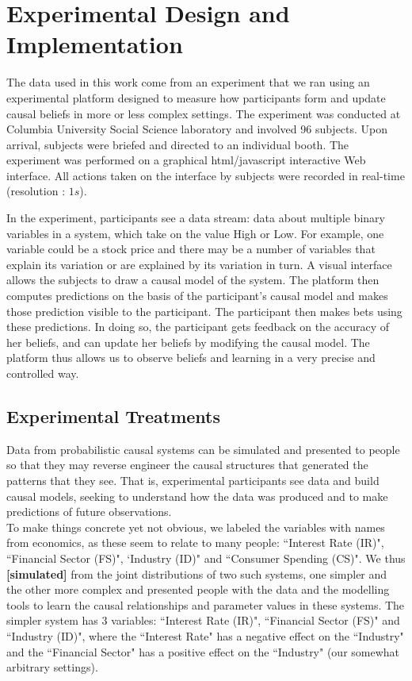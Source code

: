 \section{Experimental Design and Implementation}
\label{SI_experiment}

The data used in this work come from an experiment that we ran using an experimental platform designed to measure how participants form and update causal beliefs in more or less complex settings.  The experiment was conducted at Columbia University Social Science laboratory and involved 96 subjects.  Upon arrival, subjects were briefed and directed to an individual booth. The experiment was performed on a graphical  html/javascript interactive Web interface. All actions taken on the interface by subjects were recorded in real-time (resolution : $1s$). 

In the experiment, participants see a data stream: data about multiple binary variables in a system, which take on the value High or Low. For example, one variable could be a stock price and there may be a number of variables that explain its variation or are explained by its variation in turn.  A visual interface allows the subjects to draw a causal model of the system. The platform then computes predictions on the basis of the participant's causal model and makes those prediction visible to the participant. The participant then makes bets using these predictions. In doing so, the participant gets feedback on the accuracy of her beliefs, and can update her beliefs by modifying the causal model. The platform thus allows us to observe beliefs and learning in a very precise and controlled way.

\subsection{Experimental Treatments}
Data from probabilistic causal systems can be simulated and presented to people so that they may reverse engineer the causal structures that generated the patterns that they see. That is, experimental participants see data and build causal models, seeking to understand how the data was produced and to make predictions of future observations. \\

To make things concrete yet not obvious, we labeled the variables with names from economics, as these seem to relate to many 
people: ``Interest Rate (IR)", ``Financial Sector (FS)", `Industry (ID)" and ``Consumer Spending (CS)". We thus {\bf [simulated]} from the joint distributions of two such systems, one simpler and the other more complex and presented  people with the data and the modelling tools to learn the causal relationships and parameter values in these systems. The simpler system has 3 variables: ``Interest Rate (IR)", ``Financial Sector (FS)" and ``Industry (ID)", where the ``Interest Rate" has a negative effect on the ``Industry" and the ``Financial Sector" has a positive effect on the ``Industry" (our somewhat arbitrary settings).\\

